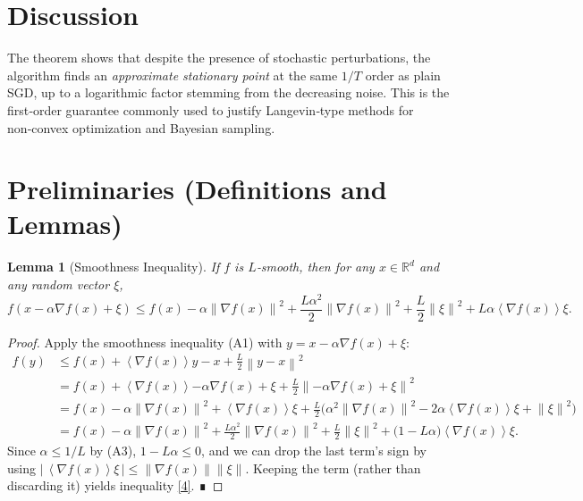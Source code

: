 \documentclass[11pt]{article}
\newtheorem{lemma}{Lemma}
\newcommand{\R}{\mathbb{R}}
\newcommand{\norm}[1]{\left\|#1\right\|}
\newcommand{\inner}[1]{\left\langle#1\right\rangle}
\begin{document}
\section*{Discussion}
The theorem shows that despite the presence of stochastic perturbations, the algorithm finds an \emph{approximate stationary point} at the same $1/T$ order as plain SGD, up to a logarithmic factor stemming from the decreasing noise. This is the first‑order guarantee commonly used to justify Langevin‑type methods for non‑convex optimization and Bayesian sampling.

\newpage
\section*{Preliminaries (Definitions and Lemmas)}
\begin{lemma}[Smoothness Inequality]\label{lem:smooth}
If $f$ is $L$‑smooth, then for any $x\in\R^{d}$ and any random vector $\xi$,
\[
f(x-\alpha\nabla f(x)+\xi)
\le f(x)-\alpha\norm{\nabla f(x)}^{2}
+ \frac{L\alpha^{2}}{2}\norm{\nabla f(x)}^{2}
+ \frac{L}{2}\norm{\xi}^{2}
+L\alpha\inner{\nabla f(x)}{\xi}.
\tag{4}
\]
\end{lemma}
\begin{proof}
Apply the smoothness inequality (A1) with $y=x-\alpha\nabla f(x)+\xi$:
\[
\begin{aligned}
f(y) &\le f(x)+\inner{\nabla f(x)}{y-x}
       +\frac{L}{2}\norm{y-x}^{2}                                     \\
     &= f(x)+\inner{\nabla f(x)}{-\alpha\nabla f(x)+\xi}
        +\frac{L}{2}\norm{-\alpha\nabla f(x)+\xi}^{2}                  \\
     &= f(x)-\alpha\norm{\nabla f(x)}^{2}
        +\inner{\nabla f(x)}{\xi}
        +\frac{L}{2}\big(\alpha^{2}\norm{\nabla f(x)}^{2}
            -2\alpha\inner{\nabla f(x)}{\xi}
            +\norm{\xi}^{2}\big)                                         \\
     &= f(x)-\alpha\norm{\nabla f(x)}^{2}
        +\frac{L\alpha^{2}}{2}\norm{\nabla f(x)}^{2}
        +\frac{L}{2}\norm{\xi}^{2}
        +\bigl(1-L\alpha\bigr)\inner{\nabla f(x)}{\xi}.               
\end{aligned}
\]
Since $\alpha\le 1/L$ by (A3), $1-L\alpha\le 0$, and we can drop the last term's sign by using $|\,\inner{\nabla f(x)}{\xi}\,|\le \norm{\nabla f(x)}\norm{\xi}$.  Keeping the term (rather than discarding it) yields inequality \eqref{4}. ∎
\end{proof}
\end{document}
